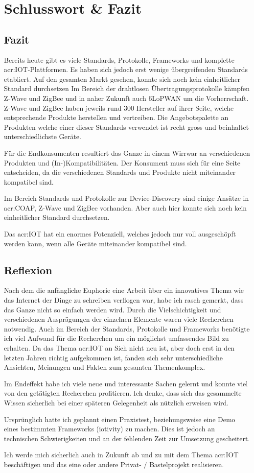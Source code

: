 \chapter{Schlusswort \& Fazit}

\section{Fazit}
Bereits heute gibt es viele Standards, Protokolle, Frameworks und komplette \gls{acr:IOT}-Plattformen. Es haben sich jedoch erst wenige übergreifenden Standards etabliert. Auf den gesamten Markt gesehen, konnte sich noch kein einheitlicher Standard durchsetzen Im Bereich der drahtlosen Übertragungsprotokolle kämpfen Z-Wave und ZigBee und in naher Zukunft auch 6LoPWAN um die Vorherrschaft. Z-Wave und ZigBee haben jeweils rund 300 Hersteller auf ihrer Seite, welche entsprechende Produkte herstellen und vertreiben. Die Angebotspalette an Produkten welche einer dieser Standards verwendet ist recht gross und beinhaltet unterschiedlichste Geräte.

Für die Endkonsumenten resultiert das Ganze in einem Wirrwar an verschiedenen Produkten und (In-)Kompatibilitäten. Der Konsument muss sich für eine Seite entscheiden, da die verschiedenen Standards und Produkte nicht miteinander kompatibel sind. 

Im Bereich Standards und Protokolle zur Device-Discovery sind einige Ansätze in \gls{acr:COAP}, Z-Wave und ZigBee vorhanden. Aber auch hier konnte sich noch kein einheitlicher Standard durchsetzen.

Das \gls{acr:IOT} hat ein enormes Potenziell, welches jedoch nur voll ausgeschöpft werden kann, wenn alle Geräte miteinander kompatibel sind.

\section{Reflexion}
Nach dem die anfängliche Euphorie eine Arbeit über ein innovatives Thema wie das Internet der Dinge zu schreiben verflogen war, habe ich rasch gemerkt, dass das Ganze nicht so einfach werden wird. Durch die Vielschichtigkeit und verschiedenen Ausprägungen der einzelnen Elemente waren viele Recherchen notwendig. Auch im Bereich der Standards, Protokolle und Frameworks benötigte ich viel Aufwand für die Recherchen um ein möglichst umfassendes Bild zu erhalten. Da das Thema \gls{acr:IOT} an Sich nicht neu ist, aber doch erst in den letzten Jahren richtig aufgekommen ist, fanden sich sehr unterschiedliche Ansichten, Meinungen und Fakten zum gesamten Themenkomplex. 

Im Endeffekt habe ich viele neue und interessante Sachen gelernt und konnte viel von den getätigten Recherchen profitieren. Ich denke, dass sich das gesammelte Wissen sicherlich bei einer späteren Gelegenheit als nützlich erweisen wird.

Ursprünglich hatte ich geplannt einen Praxistest, beziehungsweise eine Demo eines bestimmten Frameworks (iotivity) zu machen. Dies ist jedoch an technischen Schwierigkeiten und an der fehlenden Zeit zur Umsetzung gescheitert. 

Ich werde mich sicherlich auch in Zukunft ab und zu mit dem Thema \gls{acr:IOT} beschäftigen und das eine oder andere Privat- / Bastelprojekt realisieren.